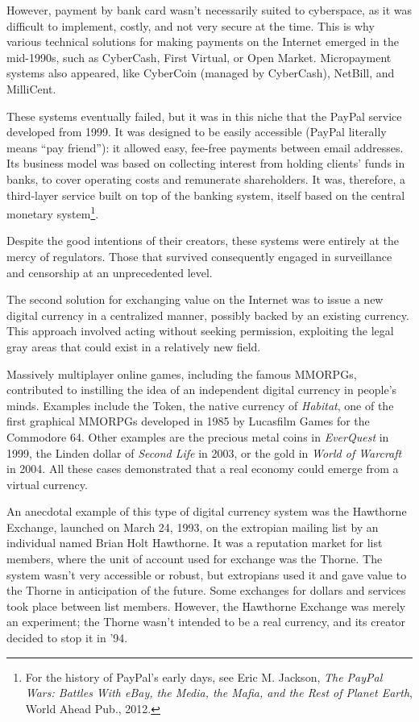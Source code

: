 \documentclass[
  a5paper,
  smalldemyvopaper,10pt,twoside,onecolumn,openright,extrafontsizes,hidelinks]{memoir}
\begin{document}
However, payment by bank card wasn't necessarily suited to cyberspace,
as it was difficult to implement, costly, and not very secure at the
time. This is why various technical solutions for making payments on the
Internet emerged in the mid-1990s, such as CyberCash, First Virtual, or
Open Market. Micropayment systems also appeared, like CyberCoin (managed
by CyberCash), NetBill, and MilliCent.

These systems eventually failed, but it was in this niche that the
PayPal service developed from 1999. It was designed to be easily
accessible (PayPal literally means ``pay friend''): it allowed easy,
fee-free payments between email addresses. Its business model was based
on collecting interest from holding clients' funds in banks, to cover
operating costs and remunerate shareholders. It was, therefore, a
third-layer service built on top of the banking system, itself based on
the central monetary system\footnote{For the history of PayPal's early
  days, see Eric M. Jackson, \emph{The PayPal Wars: Battles With eBay,
  the Media, the Mafia, and the Rest of Planet Earth}, World Ahead Pub.,
  2012.}.

Despite the good intentions of their creators, these systems were
entirely at the mercy of regulators. Those that survived consequently
engaged in surveillance and censorship at an unprecedented level.

The second solution for exchanging value on the Internet was to issue a
new digital currency in a centralized manner, possibly backed by an
existing currency. This approach involved acting without seeking
permission, exploiting the legal gray areas that could exist in a
relatively new field.

Massively multiplayer online games, including the famous MMORPGs,
contributed to instilling the idea of an independent digital currency in
people's minds. Examples include the Token, the native currency of
\emph{Habitat}, one of the first graphical MMORPGs developed in 1985 by
Lucasfilm Games for the Commodore 64. Other examples are the precious
metal coins in \emph{EverQuest} in 1999, the Linden dollar of
\emph{Second Life} in 2003, or the gold in \emph{World of Warcraft} in
2004. All these cases demonstrated that a real economy could emerge from
a virtual currency.

An anecdotal example of this type of digital currency system was the
Hawthorne Exchange, launched on March 24, 1993, on the extropian mailing
list by an individual named Brian Holt Hawthorne. It was a reputation
market for list members, where the unit of account used for exchange was
the Thorne. The system wasn't very accessible or robust, but extropians
used it and gave value to the Thorne in anticipation of the future. Some
exchanges for dollars and services took place between list members.
However, the Hawthorne Exchange was merely an experiment; the Thorne
wasn't intended to be a real currency, and its creator decided to stop
it in '94.
\end{document}
